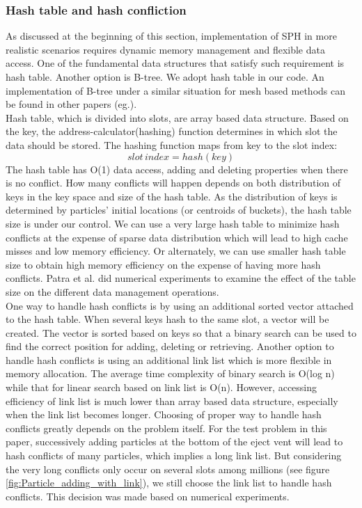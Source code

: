 \documentclass[conference,compsoc]{IEEEtran}
\begin{document}
\subsubsection{Hash table and hash confliction}
As discussed at the beginning of this section, implementation of SPH in more realistic scenarios requires dynamic memory management and flexible data access. One of the fundamental data structures that satisfy such requirement is hash table. Another option is B-tree. We adopt hash table in our code. An implementation of B-tree under a similar situation for mesh based methods can be found in other papers (eg.\cite{patra2003data}).\\
Hash table, which is divided into slots, are array based data structure. Based on the key, the address-calculator(hashing) function determines in which slot the data should be stored. The hashing function maps from key to the slot index:
\begin{equation}
slot\,index = hash(key)
\end{equation}
The hash table has O(1) data access, adding and deleting properties when there is no conflict. How many conflicts will happen depends on both distribution of keys in the key space and size of the hash table. As the distribution of keys is determined by particles' initial locations (or centroids of buckets), the hash table size is under our control. We can use a very large hash table to minimize hash conflicts at the expense of sparse data distribution which will lead to high cache misses and low memory efficiency. Or alternately, we can use smaller hash table size to obtain high memory efficiency on the expense of having more hash conflicts. Patra et al.\cite{patra2003data} did numerical experiments to examine
the effect of the table size on the different data management operations.\\
One way to handle hash conflicts is by using an additional sorted vector attached to the hash table. When several keys hash to the same slot, a vector will be created. The vector is sorted based on keys so that a binary search can be used to find the correct position for adding, deleting or retrieving. Another option to handle hash conflicts is using an additional link list which is more flexible in memory allocation. The average time complexity of binary search is O(log n) while that for linear search based on link list is O(n). However, accessing efficiency of link list is much lower than array based data structure, especially when the link list becomes longer. Choosing of proper way to handle hash conflicts greatly depends on the problem itself. For the test problem in this paper, successively adding particles at the bottom of the eject vent will lead to hash conflicts of many particles, which implies a long link list. But considering the very long conflicts only occur on several slots among millions (see figure \ref{fig:Particle_adding_with_link}), we still choose the link list to handle hash conflicts. This decision was made based on numerical experiments.
\end{document}
